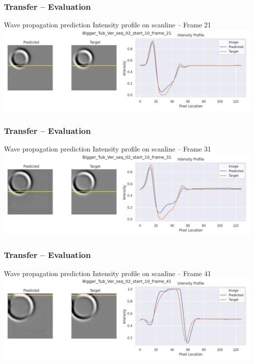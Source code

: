 \begin{frame}
    \frametitle{Transfer -- Evaluation}

Wave propagation prediction \newline
Intensity profile on scanline -- Frame 21\\[\baselineskip]

\includegraphics[width=\textwidth, height=.55\textheight]{./Ressourcen/Praesentation/Bilder/WaveTransfer/DFP/Bigger_Tub_Ver_seq_02_start_10_frame_21.png}%

\end{frame}
\clearpage
\begin{frame}
    \frametitle{Transfer -- Evaluation}

Wave propagation prediction \newline
Intensity profile on scanline -- Frame 31\\[\baselineskip]

\includegraphics[width=\textwidth, height=.55\textheight]{./Ressourcen/Praesentation/Bilder/WaveTransfer/DFP/Bigger_Tub_Ver_seq_02_start_10_frame_31.png}%

\end{frame}
\clearpage
\begin{frame}
    \frametitle{Transfer -- Evaluation}

Wave propagation prediction \newline
Intensity profile on scanline -- Frame 41\\[\baselineskip]

\includegraphics[width=\textwidth, height=.55\textheight]{./Ressourcen/Praesentation/Bilder/WaveTransfer/DFP/Bigger_Tub_Ver_seq_02_start_10_frame_41.png}%

\end{frame}
